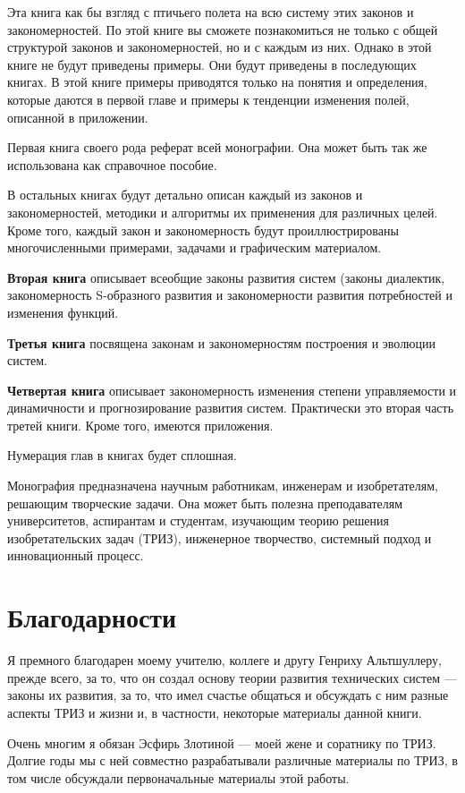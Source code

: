 \documentclass[11pt,a4paper]{article}
\begin{document}
Эта книга как бы взгляд с птичьего полета на всю систему этих законов и
закономерностей. По этой книге вы сможете познакомиться не только с общей
структурой законов и закономерностей, но и с каждым из них. Однако в этой
книге не будут приведены примеры. Они будут приведены в последующих книгах. В
этой книге примеры приводятся только на понятия и определения, которые даются
в первой главе и примеры к тенденции изменения полей, описанной в приложении.

Первая книга своего рода реферат всей монографии. Она может быть так же
использована как справочное пособие.

В остальных книгах будут детально описан каждый из законов и закономерностей,
методики и алгоритмы их применения для различных целей. Кроме того, каждый
закон и закономерность будут проиллюстрированы многочисленными примерами,
задачами и графическим материалом.

\textbf{Вторая книга} описывает всеобщие законы развития систем (законы
диалектик, закономерность S-образного развития и закономерности развития
потребностей и изменения функций.

\textbf{Третья книга} посвящена законам и закономерностям построения и
эволюции систем.

\textbf{Четвертая книга} описывает закономерность изменения степени
управляемости и динамичности и прогнозирование развития систем. Практически
это вторая часть третей книги. Кроме того, имеются приложения.

Нумерация глав в книгах будет сплошная.

Монография предназначена научным работникам, инженерам и изобретателям,
решающим творческие задачи. Она может быть полезна преподавателям
университетов, аспирантам и студентам, изучающим теорию решения
изобретательских задач (ТРИЗ), инженерное творчество, системный подход и
инновационный процесс.

\section*{Благодарности}

Я премного благодарен моему учителю, коллеге и другу Генриху Альтшуллеру,
прежде всего, за то, что он создал основу теории развития технических систем —
законы их развития, за то, что имел счастье общаться и обсуждать с ним разные
аспекты ТРИЗ и жизни и, в частности, некоторые материалы данной книги.

Очень многим я обязан Эсфирь Злотиной — моей жене и соратнику по ТРИЗ. Долгие
годы мы с ней совместно разрабатывали различные материалы по ТРИЗ, в том числе
обсуждали первоначальные материалы этой работы.
\end{document}
